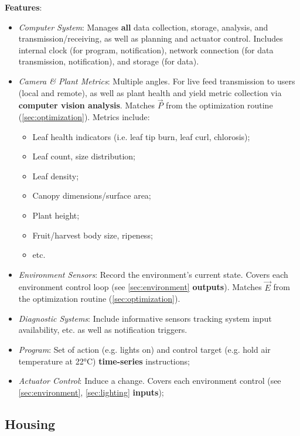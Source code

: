 \documentclass{../tex/report}
\begin{document}
\textbf{Features}:
\begin{itemize}
    \item \textit{Computer System}: Manages \textbf{all} data collection, storage, analysis, and transmission/receiving, as well as planning and actuator control. Includes internal clock (for program, notification), network connection (for data transmission, notification), and storage (for data). 
    \item \textit{Camera \& Plant Metrics}: Multiple angles. For live feed transmission to users (local and remote), as well as plant health and yield metric collection via \textbf{computer vision analysis}. Matches $\vec P$ from the optimization routine (\ref{sec:optimization}). Metrics include:
    \begin{itemize}
        \item Leaf health indicators (i.e. leaf tip burn, leaf curl, chlorosis);
        \item Leaf count, size distribution;
        \item Leaf density;
        \item Canopy dimensions/surface area;
        \item Plant height;
        \item Fruit/harvest body size, ripeness;
        \item etc.
    \end{itemize}
    \item \textit{Environment Sensors}: Record the environment's current state. Covers each environment control loop (see \ref{sec:environment} \textbf{outputs}). Matches $\vec E$ from the optimization routine (\ref{sec:optimization}).
\newpage
    \item \textit{Diagnostic Systems}: Include informative sensors tracking system input availability, etc. as well as notification triggers.
    \item \textit{Program}: Set of action (e.g. lights on) and control target (e.g. hold air temperature at 22°C) \textbf{time-series} instructions;
    \item \textit{Actuator Control}: Induce a change. Covers each environment control (see \ref{sec:environment}, \ref{sec:lighting} \textbf{inputs});
\end{itemize}

\vspace{1cm}

\subsection{Housing}
\label{sec:housing}
\end{document}
